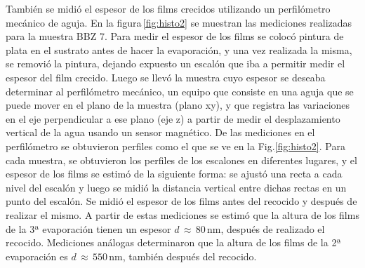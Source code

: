 También se midió el espesor de los films crecidos utilizando un perfilómetro mecánico de aguja. En la figura\,\ref{fig:histo2} se muestran las mediciones realizadas para la muestra BBZ 7. Para medir el espesor de los films se colocó pintura de plata en el sustrato antes de hacer la evaporación, y una vez realizada la misma, se removió la pintura, dejando expuesto un escalón que iba a permitir medir el espesor del film crecido. Luego se llevó la muestra cuyo espesor se deseaba determinar al perfilómetro mecánico, un equipo que consiste en una aguja que se puede mover en el plano de la muestra (plano xy), y que registra las variaciones en el eje perpendicular a ese plano (eje z) a partir de medir el desplazamiento vertical de la agua usando un sensor magnético. De las mediciones en el perfilómetro se obtuvieron perfiles como el que se ve en la Fig.\ref{fig:histo2}. Para cada muestra, se obtuvieron los perfiles de los escalones en diferentes lugares, y el espesor de los films se estimó de la siguiente forma: se ajustó una recta a cada nivel del escalón y luego se midió la distancia vertical entre dichas rectas en un punto del escalón. Se midió el espesor de los films antes del recocido y después de realizar el mismo. A partir de estas mediciones se estimó que la altura de los films de la 3ª evaporación tienen un espesor $d \, \approx \, 80 $\,nm, después de realizado el recocido. Mediciones análogas determinaron que la altura de los films de la 2ª evaporación es $d \, \approx \, 550 $\,nm, también después del recocido.

